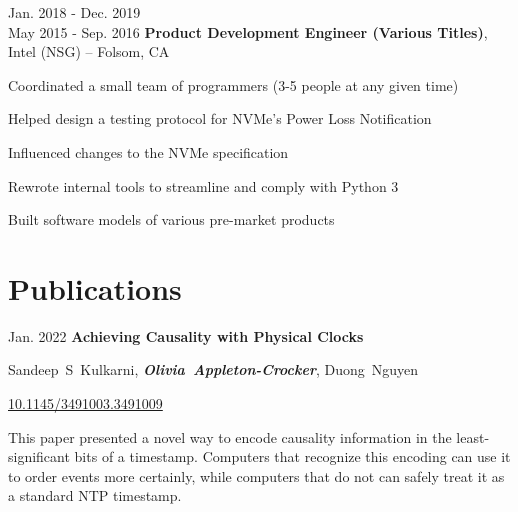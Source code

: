 	\begin{twocolentry}
		{ Jan. 2018 - Dec. 2019 \\ May 2015 - Sep. 2016 } \textbf{Product
		Development Engineer (Various Titles)}, Intel (NSG) -- Folsom, CA
	\end{twocolentry}

	\vspace{-0.35 cm}
	\begin{onecolentry}
		\begin{highlights}
			\item Coordinated a small team of programmers (3-5 people at any given
			time) \item Helped design a testing protocol for NVMe's Power Loss Notification
			\item Influenced changes to the NVMe specification \item Rewrote internal tools
			to streamline and comply with Python 3
			\item Built software models of various pre-market products
		\end{highlights}
	\end{onecolentry}

	\section{Publications}

	\begin{samepage}
		\begin{twocolentry}
			{ Jan. 2022 } \textbf{Achieving Causality with Physical Clocks}
		\end{twocolentry}

		\vspace{0.10 cm}

		\begin{onecolentry}
			\mbox{Sandeep S Kulkarni},
			\mbox{\textbf{\textit{Olivia Appleton-Crocker}}}, \mbox{Duong Nguyen}

			\vspace{0.10 cm}

			\href{https://doi.org/10.1145/3491003.3491009}{10.1145/3491003.3491009} \vspace{0.1 cm}

			This paper presented a novel way to encode causality information in the least-significant bits of a timestamp. Computers that recognize this encoding can use it to order events more certainly, while computers that do not can safely treat it as a standard NTP timestamp.
		\end{onecolentry}
	\end{samepage}

